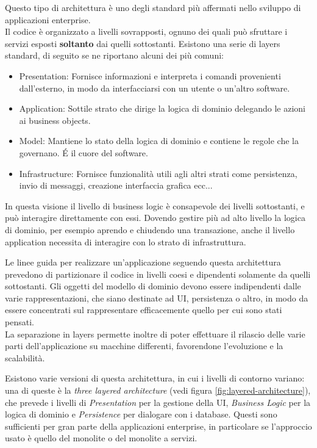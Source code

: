 Questo tipo di architettura è uno degli standard più affermati nello sviluppo di applicazioni enterprise.\\
Il codice è organizzato a livelli sovrapposti, ognuno dei quali può sfruttare i servizi esposti \textbf{soltanto} dai quelli sottostanti.
Esistono una serie di layers standard, di seguito se ne riportano alcuni dei più comuni\cite{ddd}:
\begin{itemize}
	\item Presentation: Fornisce informazioni e interpreta i comandi provenienti dall'esterno, in modo da interfacciarsi con un utente o un'altro software.
	\item Application: Sottile strato che dirige la logica di dominio delegando le azioni ai business objects.
	\item Model: Mantiene lo stato della logica di dominio e contiene le regole che la governano. \'E il cuore del software.
	\item Infrastructure: Fornisce funzionalità utili agli altri strati come persistenza, invio di messaggi, creazione interfaccia grafica ecc...
\end{itemize}
In questa visione il livello di business logic è consapevole dei livelli sottostanti, e può interagire direttamente con essi.
Dovendo gestire più ad alto livello la logica di dominio, per esempio aprendo e chiudendo una transazione, anche il livello application necessita di interagire con lo strato di infrastruttura.

Le linee guida per realizzare un'applicazione seguendo questa architettura prevedono di partizionare il codice in livelli coesi e dipendenti solamente da quelli sottostanti.
Gli oggetti del modello di dominio devono essere indipendenti dalle varie rappresentazioni, che siano destinate ad UI, persistenza o altro, in modo da essere concentrati sul rappresentare efficacemente quello per cui sono stati pensati.\\
La separazione in layers permette inoltre di poter effettuare il rilascio delle varie parti dell'applicazione su macchine differenti, favorendone l'evoluzione e la scalabilità.

Esistono varie versioni di questa architettura, in cui i livelli di contorno variano: una di queste è la \textit{three layered architecture} (vedi figura \ref{fig:layered-architecture}), che prevede i livelli di \textit{Presentation} per la gestione della UI, \textit{Business Logic} per la logica di dominio e \textit{Persistence} per dialogare con i database.
Questi sono sufficienti per gran parte della applicazioni enterprise, in particolare se l'approccio usato è quello del monolite o del monolite a servizi.\\


